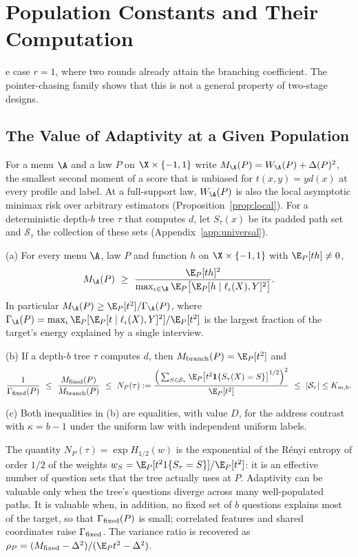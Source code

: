 \section{Population Constants and Their Computation}\label{app:E}
e case
$r=1$, where two rounds already attain the branching coefficient. The
pointer-chasing family shows that this is not a general property of
two-stage designs.

\subsection{The Value of Adaptivity at a Given Population}\label{app:population}
For a menu $\A$ and a law $P$ on $\X\times\{-1,1\}$ write
$M_\A(P)=W_\A(P)+\Delta(P)^2$, the smallest second moment of a score that is
unbiased for $t(x,y)=yd(x)$ at every profile and label. At a full-support
law, $W_\A(P)$ is also the local asymptotic minimax risk over arbitrary
estimators (Proposition~\ref{prop:local}). For a deterministic depth-$b$ tree
$\tau$ that computes $d$, let $S_\tau(x)$ be its padded path set and
$\mathcal S_\tau$ the collection of these sets
(Appendix~\ref{app:universal}).

\begin{theorem}\label{thm:bracketfull}
\textup{(a)} For every menu $\A$, law $P$ and function $h$ on
$\X\times\{-1,1\}$ with $\E_P[th]\ne0$,
\[
 M_\A(P)\ \ge\ \frac{\E_P[th]^2}{\max_{\iota\in\A}\E_P\big[\E_P[h\mid\ell_\iota(X),Y]^2\big]}.
\]
In particular $M_\A(P)\ge\E_P[t^2]/\Gamma_\A(P)$, where
$\Gamma_\A(P)=\max_\iota\E_P[\E_P[t\mid\ell_\iota(X),Y]^2]/\E_P[t^2]$ is the
largest fraction of the target's energy explained by a single interview.

\textup{(b)} If a depth-$b$ tree $\tau$ computes $d$, then
$M_{\rm branch}(P)=\E_P[t^2]$ and
\[
 \frac1{\Gamma_{\rm fixed}(P)}
 \ \le\ \frac{M_{\rm fixed}(P)}{M_{\rm branch}(P)}
 \ \le\ N_P(\tau):=\frac{\Big(\sum_{S\in\mathcal S_\tau}\E_P\big[t^2\mathbf 1\{S_\tau(X)=S\}\big]^{1/2}\Big)^2}{\E_P[t^2]}
 \ \le\ |\mathcal S_\tau|\le K_{m,b}.
\]

\textup{(c)} Both inequalities in (b) are equalities, with value $D$, for the
address contrast with $\kappa=b-1$ under the uniform law with independent
uniform labels.
\end{theorem}

The quantity $N_P(\tau)=\exp H_{1/2}(w)$ is the exponential of the R\'enyi
entropy of order $1/2$ of the weights
$w_S=\E_P[t^21\{S_\tau=S\}]/\E_P[t^2]$: it is an effective number of
question sets that the tree actually uses at $P$. Adaptivity can be valuable
only when the tree's questions diverge across many well-populated paths. It
is valuable when, in addition, no fixed set of $b$ questions explains most of
the target, so that $\Gamma_{\rm fixed}(P)$ is small; correlated features and
shared coordinates raise $\Gamma_{\rm fixed}$. The variance ratio is
recovered as $\rho_P=(M_{\rm fixed}-\Delta^2)/(\E_Pt^2-\Delta^2)$.

